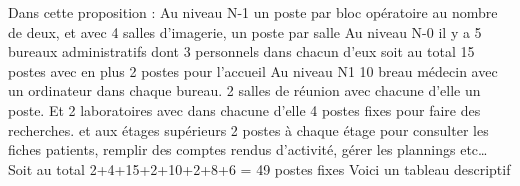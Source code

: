 Dans cette proposition :
Au niveau N-1 un poste par bloc opératoire au nombre de deux, et avec 4 salles d’imagerie, un poste par salle
Au niveau N-0 il y a 5 bureaux administratifs dont 3 personnels dans chacun d’eux soit au total 15 postes avec en plus 2 postes pour l’accueil
Au niveau N1 10 breau médecin avec un ordinateur dans chaque bureau. 2 salles de réunion avec chacune d’elle un poste. Et 2 laboratoires avec dans chacune d’elle 4 postes fixes pour faire des recherches.
et aux étages supérieurs 2 postes à chaque étage pour consulter les fiches patients, remplir des comptes rendus d’activité, gérer les plannings etc…
Soit au total 2+4+15+2+10+2+8+6 = 49 postes fixes
Voici un tableau descriptif































